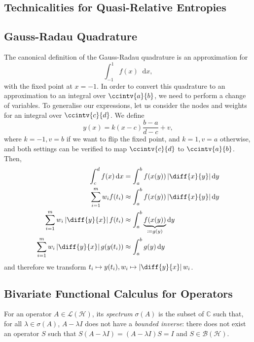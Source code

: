 \documentclass[10pt, a4paper]{article}
\numberwithin{equation}{section} %
\theoremstyle{definition}
\theoremstyle{plain}
\newcommand{\abs}[1]{\left\lvert#1\right\rvert}
\newcommand{\dif}{\mathop{}\!\mathrm{d}} %
\newcommand{\?}{\mathrel{?}} %
\newcommand{\C}{\mathbb{C}} %
\newcommand{\Hs}{\mathcal{H}} %
\begin{document}
    \begin{appendices}
      \section{Technicalities for Quasi-Relative Entropies}\label{sec:qretech}

      \subsection{Gauss-Radau Quadrature}\label{sec:qretech_grq}

      The canonical definition of the Gauss-Radau quadrature is an approximation for
      \[ \int_{-1}^{1} f(x) \dif{x}, \]
      with the fixed point at \(x = -1\). In order to convert this quadrature to an approximation to an integral over \(\ccintv{a}{b}\), we need to perform a change of variables. To generalise our expressions, let us consider the nodes and weights for an integral over \(\ccintv{c}{d}\). We define
      \[ y(x) = k(x - c)\frac{b - a}{d - c} + v, \]
      where \(k = -1, v = b\) if we want to flip the fixed point, and \(k = 1, v = a\) otherwise, and both settings can be verified to map \(\ccintv{c}{d}\) to \(\ccintv{a}{b}\). Then,
      \begin{align*}
        \int_{c}^{d} f(x) \dif{x} &= \int_{a}^{b} f(x(y)) \abs{\diff{x}{y}} \dif{y} \\
        \sum_{i=1}^m w_i f(t_i) &\approx \int_{a}^{b} f(x(y)) \abs{\diff{x}{y}} \dif{y} \\
        \sum_{i=1}^m w_i \abs{\diff{y}{x}} f(t_i) &\approx \int_{a}^{b} \underbrace{f(x(y))}_{\coloneqq g(y)} \dif{y} \\
        \sum_{i=1}^m w_i \abs{\diff{y}{x}} g(y(t_i)) &\approx \int_{a}^{b} g(y) \dif{y}
      \end{align*}
      and therefore we transform \(t_i \mapsto y(t_i), w_i \mapsto \abs{\diff{y}{x}} w_i\).

      \subsection{Bivariate Functional Calculus for Operators}

      For an operator \(A \in \mathcal{L}(\Hs)\), its \emph{spectrum} \(\sigma(A)\) is the subset of \(\C\) such that, for all \(\lambda \in \sigma(A)\), \(A - \lambda I\) does not have a \emph{bounded inverse}: there does not exist an operator \(S\) such that \(S\left( A - \lambda I \right) = \left( A - \lambda I \right)S =  I\) and \(S \in \mathcal{B}(\Hs)\).


\end{appendices}
\end{document}
